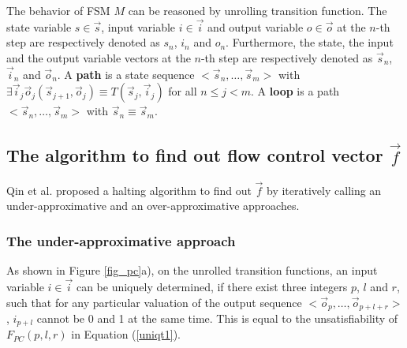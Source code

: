 \documentclass[runningheads,a4paper,orivec]{llncs}
\begin{document}
The behavior of FSM $M$ can be reasoned by unrolling transition function.
The state variable $s\in\vec{s}$, input variable $i\in\vec{i}$ and output variable $o\in\vec{o}$ at the $n$-th step 
are respectively denoted as $s_n$, $i_n$ and $o_n$.
Furthermore,
the state, the input and the output variable vectors at the $n$-th step are respectively denoted as $\vec{s}_n$, $\vec{i}_n$ and $\vec{o}_n$.
A \textbf{path} is a state sequence $<\vec{s}_n,\dots,\vec{s}_m>$ with $\exists \vec{i}_j\vec{o}_j (\vec{s}_{j+1},\vec{o}_j)\equiv T(\vec{s}_j,\vec{i}_j)$ for all $n\le j< m$.
A \textbf{loop} is a path $<\vec{s}_n,\dots,\vec{s}_m>$ with $\vec{s}_n\equiv \vec{s}_m$.



\subsection{The algorithm to find out flow control vector $\vec{f}$}\label{subsec_chkextdec}


Qin et al. \cite{QinTODAES15} proposed a halting algorithm
to find out $\vec{f}$ by iteratively calling 
an under-approximative and an over-approximative approaches.

\subsubsection{The under-approximative approach}\label{subsub_sound}
As shown in Figure \ref{fig_pc}a),
on the unrolled transition functions,
an input variable $i\in\vec{i}$ can be uniquely determined,
if there exist three integers $p$, $l$ and $r$,
such that for any particular valuation of the output sequence $<\vec{o}_p,\dots,\vec{o}_{p+l+r}>$,
$i_{p+l}$ cannot be 0 and 1 at the same time.
This is equal to the unsatisfiability of $F_{PC}(p,l,r)$ in Equation (\ref{uniqt1}).
\end{document}

